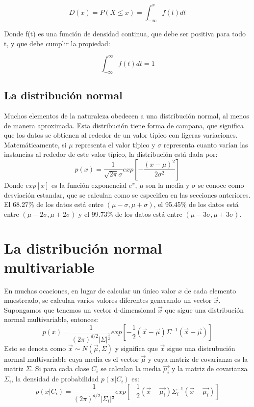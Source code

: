 \documentclass[a4paper, 11pt, oneside]{report}
\begin{document}
	\[D(x) = P(X \leq x) = \int_{-\infty}^x{f(t)dt}\]

Donde f(t) es una función de densidad continua, que debe ser positiva para todo t, y que debe cumplir la propiedad:

	\[\int_{-\infty}^{\infty}{f(t)dt} = 1\]
	
\subsection{La distribución normal}

Muchos elementos de la naturaleza obedecen a una distribución normal, al menos de manera aproximada. Esta distribución tiene forma de campana, que significa que los datos se obtienen al rededor de un valor típico con ligeras variaciones. Matemáticamente, si $\mu$ representa el valor típico y $\sigma$ representa cuanto varían las instancias al rededor de este valor típico, la distribución está dada por:
\begin{equation}
	p(x) = \frac{1}{\sqrt{2\pi}\sigma}exp\left[-\frac{(x-\mu)^2}{2\sigma^2}\right]
	\label{eq:normal}
\end{equation}
Donde $exp[x]$ es la función exponencial $e^x$, $\mu$ son la media y $\sigma$ se conoce como desviación estandar, que se calculan como se especifica en las secciones anteriores. El 68.27\% de los datos está entre $(\mu-\sigma, \mu+\sigma)$, el 95.45\% de los datos está entre $(\mu-2\sigma, \mu+2\sigma)$ y el 99.73\% de los datos está entre $(\mu-3\sigma, \mu+3\sigma)$.


\section{La distribución normal multivariable}
\label{sect:multivar}

En muchas ocaciones, en lugar de calcular un único valor $x$ de cada elemento muestreado, se calculan varios valores diferentes generando un vector $\vec{x}$. Supongamos que tenemos un vector d-dimensional $\vec{x}$ que sigue una distribución normal multivariable, entonces:
	\begin{equation}\label{eq:multDens}
		p(x) = \frac{1}{(2\pi)^{d/2}|\Sigma|^\frac{1}{2}} exp\left[{-\frac{1}{2}(\vec{x}-\vec{\mu})\Sigma^{-1}(\vec{x}-\vec{\mu})}\right]
	\end{equation}
Esto se denota como $\vec{x} \sim N(\vec{\mu},\Sigma)$ y significa que $\vec{x}$ sigue una distrubución normal multivariable cuya media es el vector $\vec{\mu}$ y cuya matriz de covarianza es la matriz $\Sigma$. Si para cada clase $C_i$ se calculan la media $\vec{\mu_i}$ y la matriz de covarianza $\Sigma_i$, la densidad de probabilidad $p(x|C_i)$ es:
	\begin{equation}\label{eq:multivariate}
		p(x|C_i) = \frac{1}{(2\pi)^{d/2}|\Sigma_i|^\frac{1}{2}} exp\left[{-\frac{1}{2}(\vec{x}-\vec{\mu_i})\Sigma_i^{-1}(\vec{x}-\vec{\mu_i})}\right]
	\end{equation}
	
\end{document}
